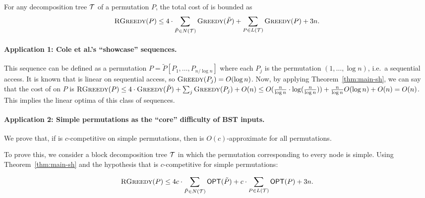 \begin{theorem}
\label{thm:main-sh} 

For any decomposition tree ${\mathcal T}$ of a permutation $P$, the total cost of \agreedy is bounded as 
\vspace{-0.05in}
\[ \textsc{RGreedy}(P) \leq 4 \cdot \sum_{\tilde P \in N({\mathcal T}) }  \textsc{Greedy}(\tilde P) + \sum_{P \in L({\mathcal T}) } \textsc{Greedy}(P)+ 3n.\]
\end{theorem} 

  
\paragraph{Application 1: Cole et al.'s ``showcase'' sequences.} 
This sequence can be defined as a permutation $P = \tilde P[P_1,\ldots, P_{n/\log n}]$ where each $P_j$ is the permutation $(1,\ldots, \log n)$, i.e.\ a sequential access. 
It is known that \greedy is linear on sequential access, so $\textsc{Greedy}(P_j)  = O( \log n)$.  
Now, by applying Theorem~\ref{thm:main-sh}, we can say that the cost of \agreedy on $P$ is $\textsc{RGreedy}(P) \leq 4 \cdot \textsc{Greedy}(\tilde P) + \sum_{j} \textsc{Greedy}(P_j) + O(n) \leq O(\frac{n}{\log n} \cdot \log (\frac{n}{\log n})) + \frac{n}{\log n}O(\log n) + O(n) = O(n)$. 
This implies the linear optima of this class of sequences.  

\paragraph{Application 2: Simple permutations as the ``core'' difficulty of BST inputs.}  

We prove that, if \greedy is $c$-competitive on simple permutations, then \agreedy is $O(c)$-approximate for all permutations. 

To prove this, we consider a block decomposition tree ${\mathcal T}$ in which the permutation corresponding to every node is simple. Using Theorem~\ref{thm:main-sh} and the hypothesis that \greedy is $c$-competitive for simple permutations:

\[\textsc{RGreedy}(P) \leq 4c \cdot \sum_{\tilde P \in  N({\mathcal T})} \mbox{\sf OPT}(\tilde P) + c \cdot \sum_{P \in L({\mathcal T})} \mbox{\sf OPT}(P) +3n.\]

